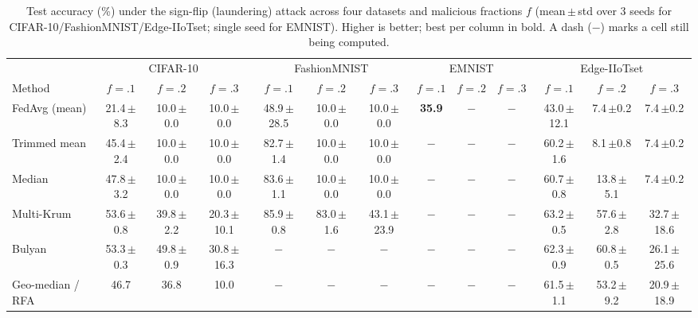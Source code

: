 \begin{table}[t]\centering\footnotesize
\caption{Test accuracy (\%) under the sign-flip (laundering) attack across four datasets and malicious fractions $f$ (mean\,$\pm$\,std over 3 seeds for CIFAR-10/FashionMNIST/Edge-IIoTset; single seed for EMNIST). Higher is better; best per column in bold. A dash ($-$) marks a cell still being computed.}
\label{tab:signflip}
\setlength{\tabcolsep}{4pt}
\begin{tabular}{@{}lcccccccccccc@{}}\toprule
& \multicolumn{3}{c}{CIFAR-10} & \multicolumn{3}{c}{FashionMNIST} & \multicolumn{3}{c}{EMNIST} & \multicolumn{3}{c}{Edge-IIoTset}\\
\cmidrule(lr){2-4}\cmidrule(lr){5-7}\cmidrule(lr){8-10}\cmidrule(l){11-13}
Method & $f{=}.1$ & $f{=}.2$ & $f{=}.3$ & $f{=}.1$ & $f{=}.2$ & $f{=}.3$ & $f{=}.1$ & $f{=}.2$ & $f{=}.3$ & $f{=}.1$ & $f{=}.2$ & $f{=}.3$\\\midrule
FedAvg (mean) & 21.4\,{\scriptsize$\pm$8.3} & 10.0\,{\scriptsize$\pm$0.0} & 10.0\,{\scriptsize$\pm$0.0} & 48.9\,{\scriptsize$\pm$28.5} & 10.0\,{\scriptsize$\pm$0.0} & 10.0\,{\scriptsize$\pm$0.0} & \textbf{35.9} & $-$ & $-$ & 43.0\,{\scriptsize$\pm$12.1} & 7.4\,{\scriptsize$\pm$0.2} & 7.4\,{\scriptsize$\pm$0.2}\\
Trimmed mean & 45.4\,{\scriptsize$\pm$2.4} & 10.0\,{\scriptsize$\pm$0.0} & 10.0\,{\scriptsize$\pm$0.0} & 82.7\,{\scriptsize$\pm$1.4} & 10.0\,{\scriptsize$\pm$0.0} & 10.0\,{\scriptsize$\pm$0.0} & $-$ & $-$ & $-$ & 60.2\,{\scriptsize$\pm$1.6} & 8.1\,{\scriptsize$\pm$0.8} & 7.4\,{\scriptsize$\pm$0.2}\\
Median & 47.8\,{\scriptsize$\pm$3.2} & 10.0\,{\scriptsize$\pm$0.0} & 10.0\,{\scriptsize$\pm$0.0} & 83.6\,{\scriptsize$\pm$1.1} & 10.0\,{\scriptsize$\pm$0.0} & 10.0\,{\scriptsize$\pm$0.0} & $-$ & $-$ & $-$ & 60.7\,{\scriptsize$\pm$0.8} & 13.8\,{\scriptsize$\pm$5.1} & 7.4\,{\scriptsize$\pm$0.2}\\
Multi-Krum & 53.6\,{\scriptsize$\pm$0.8} & 39.8\,{\scriptsize$\pm$2.2} & 20.3\,{\scriptsize$\pm$10.1} & 85.9\,{\scriptsize$\pm$0.8} & 83.0\,{\scriptsize$\pm$1.6} & 43.1\,{\scriptsize$\pm$23.9} & $-$ & $-$ & $-$ & 63.2\,{\scriptsize$\pm$0.5} & 57.6\,{\scriptsize$\pm$2.8} & 32.7\,{\scriptsize$\pm$18.6}\\
Bulyan & 53.3\,{\scriptsize$\pm$0.3} & 49.8\,{\scriptsize$\pm$0.9} & 30.8\,{\scriptsize$\pm$16.3} & $-$ & $-$ & $-$ & $-$ & $-$ & $-$ & 62.3\,{\scriptsize$\pm$0.9} & 60.8\,{\scriptsize$\pm$0.5} & 26.1\,{\scriptsize$\pm$25.6}\\
Geo-median / RFA & 46.7 & 36.8 & 10.0 & $-$ & $-$ & $-$ & $-$ & $-$ & $-$ & 61.5\,{\scriptsize$\pm$1.1} & 53.2\,{\scriptsize$\pm$9.2} & 20.9\,{\scriptsize$\pm$18.9}\\

\end{tabular}
\end{table}
